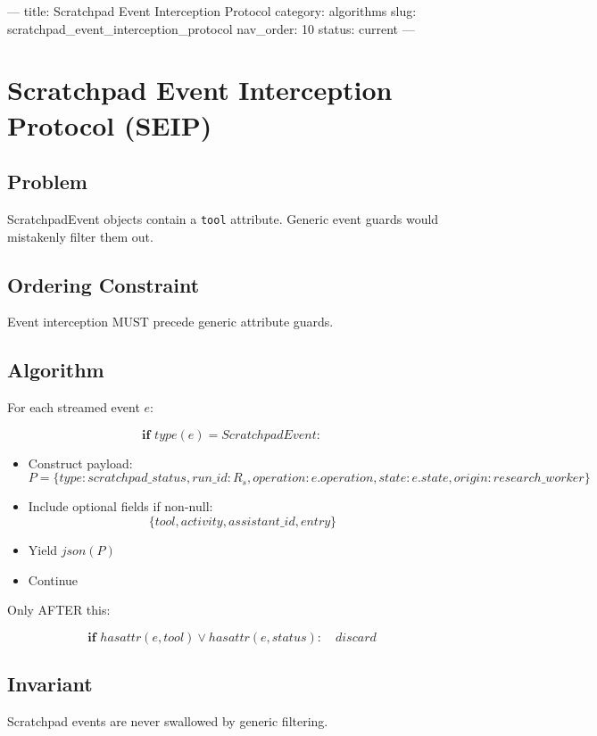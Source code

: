 ---
title: Scratchpad Event Interception Protocol
category: algorithms
slug: scratchpad_event_interception_protocol
nav_order: 10
status: current
---

\section{Scratchpad Event Interception Protocol (SEIP)}

\subsection*{Problem}

ScratchpadEvent objects contain a \texttt{tool} attribute.
Generic event guards would mistakenly filter them out.

\subsection*{Ordering Constraint}

Event interception MUST precede generic attribute guards.

\subsection*{Algorithm}

For each streamed event $e$:

\[
\textbf{if } type(e) = ScratchpadEvent:
\]
\begin{itemize}
    \item Construct payload:
    \[
    P = \{
        type: scratchpad\_status,
        run\_id: R_s,
        operation: e.operation,
        state: e.state,
        origin: research\_worker
    \}
    \]
    \item Include optional fields if non-null:
    \[
    \{ tool, activity, assistant\_id, entry \}
    \]
    \item Yield $json(P)$
    \item Continue
\end{itemize}

Only AFTER this:

\[
\textbf{if } hasattr(e, tool) \lor hasattr(e, status):
\quad discard
\]

\subsection*{Invariant}

Scratchpad events are never swallowed by generic filtering.